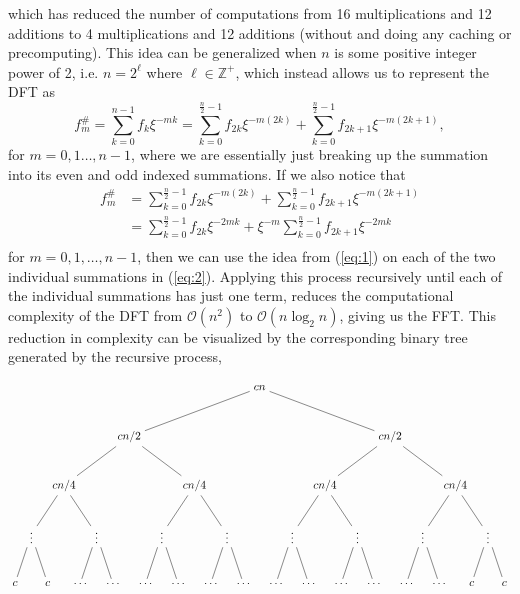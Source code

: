 \documentclass[11pt]{article}
\begin{document}
which has reduced the number of computations from 16 multiplications and 12 additions to 4 multiplications
and 12 additions (without and doing any caching or precomputing).
This idea can be generalized when $n$ is some positive integer power of 2,
i.e. $n = 2^{\ell}$ where $\ell \in \mathbb{Z}^+$, which instead allows us to represent the DFT as
\begin{equation}
	\label{eq:1}
	f_{m}^{\#} = \sum_{k=0}^{n-1}{f_k\xi^{-mk}} = \sum_{k=0}^{\frac{n}{2}-1}{f_{2k}\xi^{-m(2k)}} + \sum_{k=0}^{\frac{n}{2}-1}{f_{2k + 1}\xi^{-m(2k+1)}},
\end{equation}
for $m = 0,1\dots,n-1$, where we are essentially just breaking up the summation into its even and odd indexed
summations. If we also notice that
\begin{equation}
	\begin{aligned}
		f_{m}^{\#} &= \sum_{k=0}^{\frac{n}{2}-1}{f_{2k}\xi^{-m(2k)}} + \sum_{k=0}^{\frac{n}{2}-1}{f_{2k + 1}\xi^{-m(2k+1)}} \\
		&= \sum_{k=0}^{\frac{n}{2}-1}{f_{2k}\xi^{-2mk}} + \xi^{-m}\sum_{k=0}^{\frac{n}{2}-1}{f_{2k + 1}\xi^{-2mk}} \\
	\end{aligned}
	\label{eq:2}
\end{equation}
for $m = 0,1,\dots,n-1$, then we can use the idea from (\ref{eq:1}) on each of the two individual summations in (\ref{eq:2}).
Applying this process recursively until each of the individual summations has just one term,
reduces the computational complexity of the DFT from
$\mathcal{O}(n^2)$ to $\mathcal{O}(n\log_2{n})$, giving us the FFT.
This reduction in complexity can be visualized by the corresponding binary tree generated by the recursive process,

\[
\begin{tikzpicture}[level distance=1.5cm,
  level 1/.style={sibling distance=8cm},
  level 2/.style={sibling distance=4cm},
  level 3/.style={sibling distance=2cm},
  level 4/.style={sibling distance=1cm}]

  \node {$cn$}
    child {node {$cn/2$}
      child {node {$cn/4$}
        child {node {$\vdots$}
          child {node {$c$}}
          child {node {$c$}}
        }
        child {node {$\vdots$}
          child {node {$\ldots$}}
          child {node {$\ldots$}}
        }
      }
      child {node {$cn/4$}
        child {node {$\vdots$}
          child {node {$\ldots$}}
          child {node {$\ldots$}}
        }
        child {node {$\vdots$}
          child {node {$\ldots$}}
          child {node {$\ldots$}}
        }
      }
    }
    child {node {$cn/2$}
      child {node {$cn/4$}
        child {node {$\vdots$}
          child {node {$\ldots$}}
          child {node {$\ldots$}}
        }
        child {node {$\vdots$}
          child {node {$\ldots$}}
          child {node {$\ldots$}}
        }
      }
      child {node {$cn/4$}
        child {node {$\vdots$}
          child {node {$\ldots$}}
          child {node {$\ldots$}}
        }
        child {node {$\vdots$}
          child {node {$c$}}
          child {node {$c$}}
        }
      }
    };
\end{tikzpicture}
\]
\end{document}
